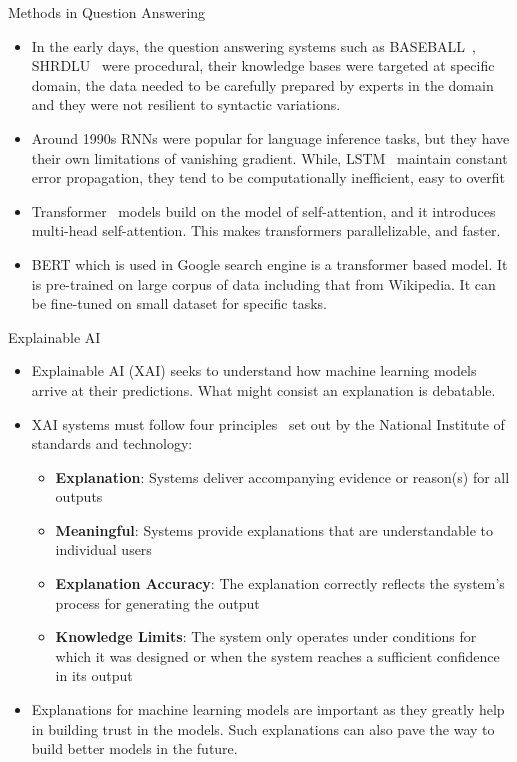 \documentclass[10pt]{beamer}
\begin{document}
\begin{frame}{Methods in Question Answering}
\begin{itemize}
    \item In the early days, the question answering systems such as BASEBALL~\cite{BASEBALL}, SHRDLU~\cite{SHRDLU} were procedural, their knowledge bases were targeted at specific domain, the data needed to be carefully prepared by experts in the domain and they were not resilient to syntactic variations.
    \item Around 1990s RNNs were popular for language inference tasks, but they have their own limitations of vanishing gradient. While, LSTM~\cite{LSTM} maintain constant error propagation, they tend to be computationally ineﬀicient, easy to overfit
    \item Transformer~\cite{Transformer} models build on the model of self-attention, and it introduces multi-head self-attention. This makes transformers parallelizable, and faster. 
    \item BERT which is used in Google search engine is a transformer based model. It is pre-trained on large corpus of data including that from Wikipedia. It can be fine-tuned on small dataset for specific tasks.
\end{itemize}
\end{frame}
\begin{frame}{Explainable AI}
    \begin{itemize}
        \item Explainable AI (XAI) seeks to understand how machine learning models arrive at their predictions. What might consist an explanation is debatable.
        \item XAI systems must follow four principles~\cite{Nist} set out by the National Institute of standards and technology:
\begin{itemize}
    \item \textbf{Explanation}: Systems deliver accompanying evidence or reason(s) for all outputs
    \item \textbf{Meaningful}: Systems provide explanations that are understandable to individual users
    \item \textbf{Explanation Accuracy}: The explanation correctly reflects the system’s process for generating the output 
    \item \textbf{Knowledge Limits}: The system only operates under conditions for which it was designed or when the system reaches a sufficient confidence in its output
\end{itemize}

\item Explanations for machine learning models are important as they greatly help in building trust in the models. Such explanations can also pave the way to build better models in the future.
    \end{itemize}
\end{frame}
\end{document}
